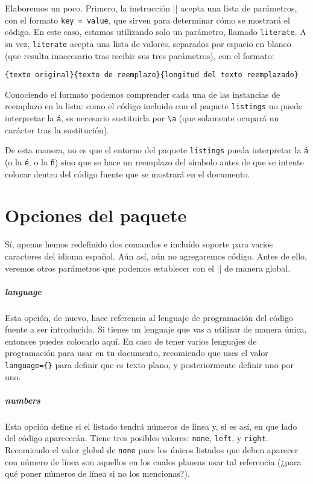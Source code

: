 Elaboremos un poco. Primero, la instrucción |\lstset| acepta una lista de parámetros, con el formato \texttt{key = value}, que sirven para determinar cómo se mostrará el código. En este caso, estamos utilizando solo un parámetro, llamado \texttt{literate}. A su vez, \texttt{literate} acepta una lista de valores, separados por espacio en blanco (que resulta innecesario tras recibir sus tres parámetros), con el formato:

\begin{lstlisting}[style=latex]
{texto original}{texto de reemplazo}{longitud del texto reemplazado}
\end{lstlisting}

Conociendo el formato podemos comprender cada una de las instancias de reemplazo en la lista: como el código incluido con el paquete \texttt{listings} no puede interpretar la \texttt{á}, es necesario sustituirla por \texttt{\textbackslash{}\textquotesingle{}a} (que solamente ocupará un carácter tras la sustitución).

De esta manera, no es que el entorno del paquete \texttt{listings} pueda interpretar la \texttt{á} (o la \texttt{é}, o la \texttt{ñ}) sino que se hace un reemplazo del símbolo antes de que se intente colocar dentro del código fuente que se mostrará en el documento.



\section{Opciones del paquete}
\label{sec:opciones_de_listing}



Sí, apenas hemos redefinido dos comandos e incluído soporte para varios caracteres del idioma español. Aún así, aún no agregaremos código. Antes de ello, veremos otros parámetros que podemos establecer con el |\lstset| de manera global.

\subparagraph{language} Esta opción, de nuevo, hace referencia al lenguaje de programación del código fuente a ser introducido. Si tienes un lenguaje que vas a utilizar de manera única, entonces puedes colocarlo aquí. En caso de tener varios lenguajes de programación para usar en tu documento, recomiendo que uses el valor \texttt{language=\{\}} para definir que es texto plano, y posteriormente definir uno por uno.

\subparagraph{numbers} Esta opción define si el listado tendrá números de línea y, si es así, en que lado del código aparecerán. Tiene tres posibles valores: \texttt{none}, \texttt{left}, y \texttt{right}. Recomiendo el valor global de \texttt{none} pues los únicos listados que deben aparecer con número de línea son aquellos en los cuales planeas usar tal referencia (¿para qué poner números de línea si no los mencionas?).


